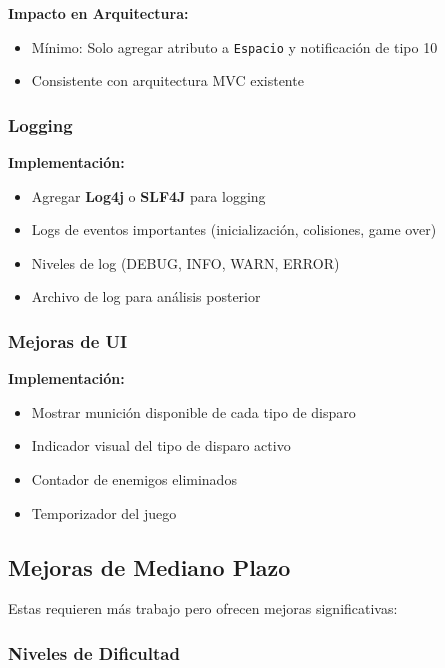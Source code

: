 \documentclass[12pt, a4paper]{article}
\begin{document}
\textbf{Impacto en Arquitectura:}
\begin{itemize}[leftmargin=2em]
    \item Mínimo: Solo agregar atributo a \texttt{Espacio} y notificación de tipo 10
    \item Consistente con arquitectura MVC existente
\end{itemize}

\subsubsection{Logging}

\textbf{Implementación:}
\begin{itemize}[leftmargin=2em]
    \item Agregar \textbf{Log4j} o \textbf{SLF4J} para logging
    \item Logs de eventos importantes (inicialización, colisiones, game over)
    \item Niveles de log (DEBUG, INFO, WARN, ERROR)
    \item Archivo de log para análisis posterior
\end{itemize}

\subsubsection{Mejoras de UI}

\textbf{Implementación:}
\begin{itemize}[leftmargin=2em]
    \item Mostrar munición disponible de cada tipo de disparo
    \item Indicador visual del tipo de disparo activo
    \item Contador de enemigos eliminados
    \item Temporizador del juego
\end{itemize}

\subsection{Mejoras de Mediano Plazo}

Estas requieren más trabajo pero ofrecen mejoras significativas:

\subsubsection{Niveles de Dificultad}
\end{document}
